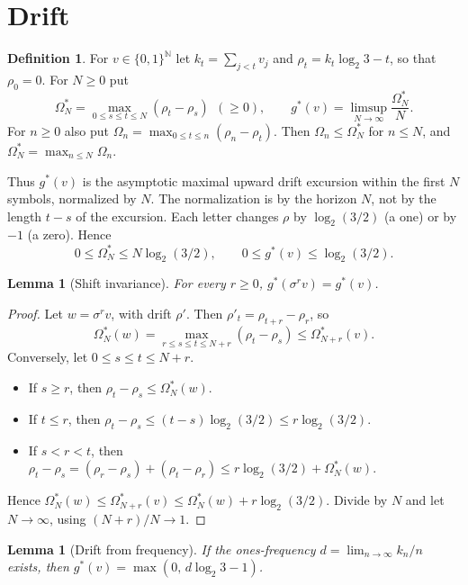 \documentclass[11pt]{amsart}
\newtheorem{lemma}[theorem]{Lemma}
\theoremstyle{definition}
\newtheorem{definition}[theorem]{Definition}
\theoremstyle{remark}
\newcommand{\N}{\mathbb{N}}
\newcommand{\gs}{g^{*}}
\newcommand{\Om}{\Omega^{*}}
\begin{document}
\section{Drift}\label{sec:drift}

\begin{definition}
For $v\in\{0,1\}^{\N}$ let $k_t=\sum_{j<t}v_j$ and $\rho_t=k_t\log_2 3-t$, so that $\rho_0=0$. For $N\ge0$ put
\[
\Om_N=\max_{0\le s\le t\le N}(\rho_t-\rho_s)\ \ (\ge 0),\qquad \gs(v)=\limsup_{N\to\infty}\frac{\Om_N}{N}.
\]
For $n\ge0$ also put $\Omega_n=\max_{0\le t\le n}(\rho_n-\rho_t)$. Then $\Omega_n\le\Om_N$ for $n\le N$, and $\Om_N=\max_{n\le N}\Omega_n$.
\end{definition}

Thus $\gs(v)$ is the asymptotic maximal upward drift excursion within the first $N$ symbols, normalized by $N$. The normalization is by the horizon $N$, not by the length $t-s$ of the excursion. Each letter changes $\rho$ by $\log_2(3/2)$ (a one) or by $-1$ (a zero). Hence
\begin{equation}\label{eq:worst}
0\le\Om_N\le N\log_2(3/2),\qquad 0\le\gs(v)\le\log_2(3/2).
\end{equation}

\begin{lemma}[Shift invariance]\label{lem:shift}
For every $r\ge0$, $\gs(\sigma^r v)=\gs(v)$.
\end{lemma}

\begin{proof}
Let $w=\sigma^r v$, with drift $\rho'$. Then $\rho'_t=\rho_{t+r}-\rho_r$, so
\[
\Om_N(w)=\max_{r\le s\le t\le N+r}(\rho_t-\rho_s)\le\Om_{N+r}(v).
\]
Conversely, let $0\le s\le t\le N+r$.
\begin{itemize}[leftmargin=2em]
\item If $s\ge r$, then $\rho_t-\rho_s\le\Om_N(w)$.
\item If $t\le r$, then $\rho_t-\rho_s\le(t-s)\log_2(3/2)\le r\log_2(3/2)$.
\item If $s<r<t$, then $\rho_t-\rho_s=(\rho_r-\rho_s)+(\rho_t-\rho_r)\le r\log_2(3/2)+\Om_N(w)$.
\end{itemize}
Hence $\Om_N(w)\le\Om_{N+r}(v)\le\Om_N(w)+r\log_2(3/2)$. Divide by $N$ and let $N\to\infty$, using $(N+r)/N\to1$.
\end{proof}

\begin{lemma}[Drift from frequency]\label{lem:freq}
If the ones-frequency $d=\lim_{n\to\infty}k_n/n$ exists, then $\gs(v)=\max(0,\,d\log_2 3-1)$.
\end{lemma}
\end{document}
